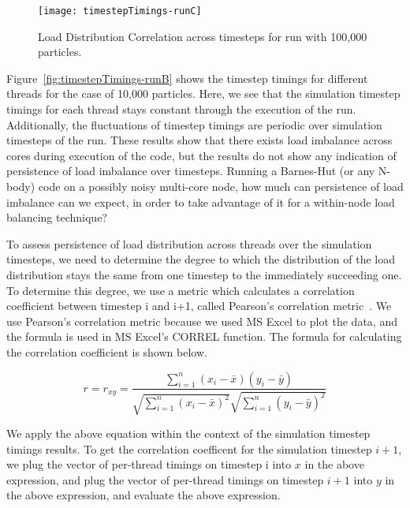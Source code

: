 \documentclass[11pt]{article}
\begin{document}
\begin{figure}[ht!]
\label{fig:timestepTimings-runC}
\begin{center}
\texttt{[image: timestepTimings-runC]}
\end{center}
\caption{\label{fig:timestepTimings-runC}Load Distribution Correlation
  across timesteps for run with 100,000 particles.}
\end{figure}

Figure~\ref{fig:timestepTimings-runB} shows the timestep timings for
different threads for the case of 10,000 particles. Here, we see that
the simulation timestep timings for each thread stays constant through
the execution of the run. Additionally, the fluctuations of timestep
timings are periodic over simulation timesteps of the
run. These results show that there exists load imbalance across cores
during execution of the code, but the results do not show any
indication of persistence of load imbalance over timesteps.
Running a Barnes-Hut (or any N-body) code on a possibly noisy multi-core
node, how much can persistence of load imbalance can we expect, in order to take advantage of it for a within-node load balancing technique?

To assess persistence of load distribution across threads over the
simulation timesteps, we need to determine the degree to
which the distribution of the load distribution stays
the same from one timestep to the immediately succeeding one. To
determine this degree, we use a metric which calculates a correlation
coefficient between timestep i and i+1, called Pearson's
correlation metric~\cite{PearsonsCorrel}. We use Pearson's correlation
metric because we used MS Excel to plot the data, and the formula is
used in MS Excel's CORREL function. The formula for calculating the
correlation coefficient is shown below.

$$r = r_{xy} =\frac{\sum ^n _{i=1}(x_i - \bar{x})(y_i
  -\bar{y})}{\sqrt{\sum ^n _{i=1}(x_i - \bar{x})^2}
  \sqrt{\sum^n_{i=1}(y_i - \bar{y})^2}}$$ 

We apply the above equation within the context of the simulation timestep
timings results. To get the correlation coefficent for the simulation
timestep $i+1$, we plug the vector of per-thread timings on
timestep i into $x$ in the above expression, and plug the vector of
per-thread timings on timestep $i+1$ into $y$ in the above expression,
and evaluate the above expression. 
\end{document}
